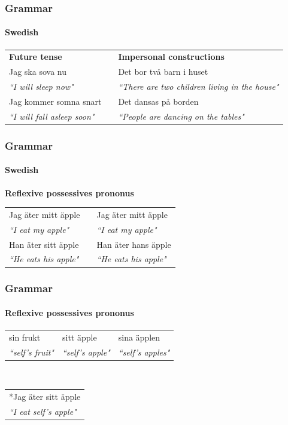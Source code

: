 \documentclass[10pt]{beamer}
\begin{document}
\begin{frame}
\frametitle{Grammar}
\framesubtitle{Swedish} 
\begin{tabular}{lll}
 \textbf{Future tense}  &&\textbf{Impersonal constructions} \\
Jag ska sova nu & &Det bor två barn i huset \\
\emph{``I will sleep now"} && \emph{``There are two children living in the house"} \\
Jag kommer somna snart &&Det dansas på borden  \\
\emph{``I will fall asleep soon"} &&\emph{``People are dancing on the tables"}  \\
\end{tabular}
\end{frame}

\begin{frame}
\frametitle{Grammar}
\framesubtitle{Swedish} 
\textbf{Reflexive possessives prononus}\\
\begin{tabular}{lll}
Jag äter mitt äpple && Jag äter mitt äpple \\
\emph{``I eat my apple"} && \emph{``I eat my apple"} \\
Han äter sitt äpple && Han äter hans äpple \\
\emph{``He eats his apple"} && \emph{``He eats his apple"} \\
\end{tabular}
\end{frame}


\begin{frame}
\frametitle{Grammar}
\framesubtitle{Reflexive possessives prononus}
\begin{tabular}{lll}
sin frukt & sitt äpple &sina äpplen \\
\emph{``{\sc self's} fruit"} & \emph{``{\sc self's} apple"} & \emph{``{\sc self's} apples"} \\
\end{tabular}
\\
\vspace{5mm}
\begin{tabular}{l}
\pause
*Jag äter sitt äpple \\
\emph{``I eat {\sc self's} apple"} \\
\end{tabular}
\end{frame}


\end{document}

